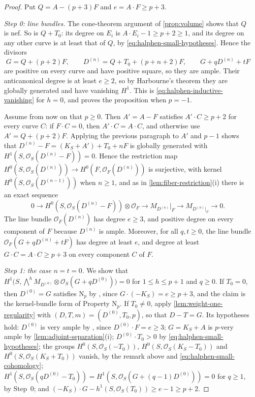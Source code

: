 \documentclass[11pt,reqno]{amsart}
\numberwithin{equation}{section}
\theoremstyle{remark}
\newcommand{\sshf}[1]{\mathcal{O}_{#1}}
\newcommand{\NP}{\mathrm N}
\begin{document}
\begin{proof}
Put \(Q=A-(p+3)F\) and \(e=A\cdot F\geq p+3\).

\smallskip\noindent\emph{Step 0: line bundles.} The cone-theorem argument of \cref{prop:volume} shows that \(Q\) is nef. So is \(Q+T_0\): its degree on \(E_i\) is \(A\cdot E_i-1\geq p+2\geq1\), and its degree on any other curve is at least that of \(Q\), by \eqref{eq:halphen-small-hypotheses}. Hence the divisors
\[
 G=Q+(p+2)F,\qquad D^{(n)}=Q+T_0+(p+n+2)F,\qquad G+qD^{(n)}+tF
\]
are positive on every curve and have positive square, so they are ample. Their anticanonical degree is at least \(e\geq2\), so by Harbourne's theorem they are globally generated and have vanishing \(H^1\). This is \eqref{eq:halphen-inductive-vanishing} for \(h=0\), and proves the proposition when \(p=-1\).

Assume from now on that \(p\geq0\). Then \(A'=A-F\) satisfies \(A'\cdot C\geq p+2\) for every curve \(C\): if \(F\cdot C=0\), then \(A'\cdot C=A\cdot C\), and otherwise use \(A'=Q+(p+2)F\). Applying the previous paragraph to \(A'\) and \(p-1\) shows that \(D^{(n)}-F=(K_S+A')+T_0+nF\) is globally generated with \(H^1(S,\sshf{S}(D^{(n)}-F))=0\). Hence the restriction map \(H^0(S,\sshf{S}(D^{(n)}))\to H^0(F,\sshf{F}(D^{(n)}))\) is surjective, with kernel \(H^0(S,\sshf{S}(D^{(n-1)}))\) when \(n\geq1\), and as in \cref{lem:fiber-restriction}\textup{(i)} there is an exact sequence
\begin{equation}\label{eq:halphen-restriction-kernel}
 0\longrightarrow H^0(S,\sshf{S}(D^{(n)}-F))\otimes\sshf{F}
 \longrightarrow M_{D^{(n)}}|_F\longrightarrow M_{D^{(n)}|_F}\longrightarrow0.
\end{equation}
The line bundle \(\sshf{F}(D^{(n)})\) has degree \(e\geq3\), and positive degree on every component of \(F\) because \(D^{(n)}\) is ample. Moreover, for all \(q,t\geq0\), the line bundle \(\sshf{F}(G+qD^{(n)}+tF)\) has degree at least \(e\), and degree at least \(G\cdot C=A\cdot C\geq p+3\) on every component \(C\) of \(F\).

\smallskip\noindent\emph{Step 1: the case \(n=t=0\).} We show that \(H^1\bigl(S,\bigwedge^hM_{D^{(0)}}\otimes\sshf{S}(G+qD^{(0)})\bigr)=0\) for \(1\leq h\leq p+1\) and \(q\geq0\). If \(T_0=0\), then \(D^{(0)}=G\) satisfies \(\NP_p\) by \cite[Theorem 1.3]{GP01}, since \(G\cdot(-K_S)=e\geq p+3\), and the claim is the kernel-bundle form of Property \(\NP_p\). If \(T_0\neq0\), apply \cref{lem:weight-one-regularity} with \((D,T,m)=(D^{(0)},T_0,p)\), so that \(D-T=G\). Its hypotheses hold: \(D^{(0)}\) is very ample by \cite[Theorem 1.3]{GP01}, since \(D^{(0)}\cdot F=e\geq3\); \(G=K_S+A\) is \(p\)-very ample by \cref{lem:adjoint-separation}\textup{(i)}; \(D^{(0)}\cdot T_0>0\) by \eqref{eq:halphen-small-hypotheses}; the groups \(H^0(S,\sshf{S}(-T_0))\), \(H^0(S,\sshf{S}(K_S-T_0))\) and \(H^0(S,\sshf{S}(K_S+T_0))\) vanish, by the remark above and \eqref{eq:halphen-small-cohomology}; \(H^1(S,\sshf{S}(qD^{(0)}-T_0))=H^1(S,\sshf{S}(G+(q-1)D^{(0)}))=0\) for \(q\geq1\), by Step~0; and \((-K_S)\cdot G-h^1(S,\sshf{S}(T_0))\geq e-1\geq p+2\).


\end{proof}
\end{document}
